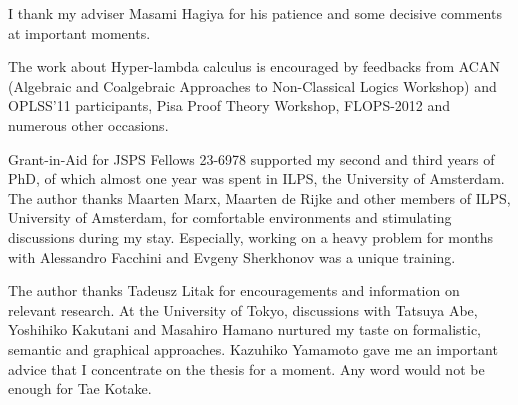 \begin{acknowledge}
 I thank my adviser Masami Hagiya for his patience and some decisive
 comments at important moments.

 The work about Hyper-lambda calculus is encouraged by feedbacks from
 ACAN (Algebraic and Coalgebraic
 Approaches to
 Non-Classical Logics Workshop) and OPLSS'11 participants,
 Pisa Proof Theory Workshop, FLOPS-2012
 and numerous other occasions.

 Grant-in-Aid for JSPS Fellows 23-6978 supported
 my second and third years of PhD, of which almost one year was spent
 in ILPS, the University of Amsterdam.
 The author thanks Maarten Marx, Maarten de Rijke and other members of ILPS,
 University of Amsterdam, for
 comfortable environments and stimulating discussions during my stay.
 Especially, working on a heavy problem for months with Alessandro
 Facchini and Evgeny Sherkhonov was a unique training.

 The author thanks Tadeusz Litak for encouragements and
 information on relevant research.
 At the University of Tokyo,
 discussions with Tatsuya Abe, Yoshihiko Kakutani and Masahiro Hamano
 nurtured my taste on formalistic, semantic and graphical approaches.
 Kazuhiko Yamamoto gave me an important advice that I concentrate on the
 thesis for a moment.
 Any word would not be enough for Tae Kotake.

\end{acknowledge}
